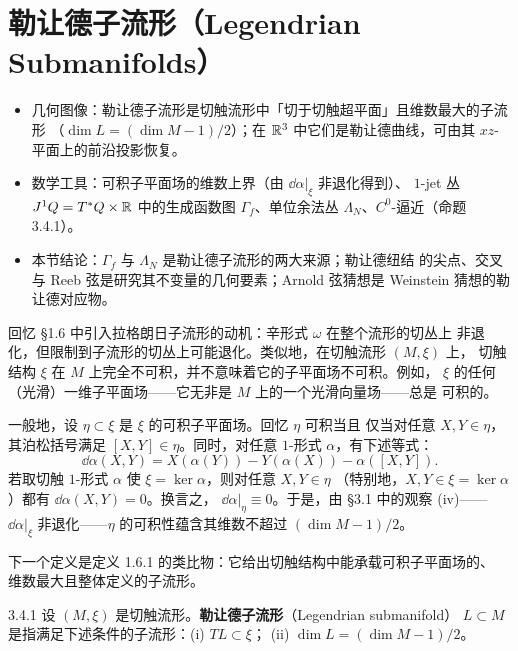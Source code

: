 \section{勒让德子流形（Legendrian Submanifolds）}

\begin{keytakeaways}
\begin{itemize}
  \item 几何图像：勒让德子流形是切触流形中「切于切触超平面」且维数最大的子流形
        （$\dim L=(\dim M-1)/2$）；在 $\mathbb{R}^3$ 中它们是勒让德曲线，可由其
        $xz$-平面上的前沿投影恢复。
  \item 数学工具：可积子平面场的维数上界（由 $\dd\alpha|_\xi$ 非退化得到）、
        $1$-jet 丛 $J^1Q=T^*Q\times\mathbb{R}$ 中的生成函数图 $\Gamma_f$、单位余法丛
        $\Lambda_N$、$C^0$-逼近（命题 3.4.1）。
  \item 本节结论：$\Gamma_f$ 与 $\Lambda_N$ 是勒让德子流形的两大来源；勒让德纽结
        的尖点、交叉与 Reeb 弦是研究其不变量的几何要素；Arnold 弦猜想是
        Weinstein 猜想的勒让德对应物。
\end{itemize}
\end{keytakeaways}

回忆 §1.6 中引入拉格朗日子流形的动机：辛形式 $\omega$ 在整个流形的切丛上
非退化，但限制到子流形的切丛上可能退化。类似地，在切触流形 $(M,\xi)$ 上，
切触结构 $\xi$ 在 $M$ 上完全不可积，并不意味着它的子平面场不可积。例如，
$\xi$ 的任何（光滑）一维子平面场——它无非是 $M$ 上的一个光滑向量场——总是
可积的。

一般地，设 $\eta\subset\xi$ 是 $\xi$ 的可积子平面场。回忆 $\eta$ 可积当且
仅当对任意 $X,Y\in\eta$，其泊松括号满足 $[X,Y]\in\eta$。同时，对任意
$1$-形式 $\alpha$，有下述等式：
\[
  \dd\alpha(X,Y)=X(\alpha(Y))-Y(\alpha(X))-\alpha([X,Y]).
\]
若取切触 $1$-形式 $\alpha$ 使 $\xi=\ker\alpha$，则对任意 $X,Y\in\eta$
（特别地，$X,Y\in\xi=\ker\alpha$）都有 $\dd\alpha(X,Y)=0$。换言之，
$\dd\alpha|_\eta\equiv0$。于是，由 §3.1 中的观察 (iv)——$\dd\alpha|_\xi$
非退化——$\eta$ 的可积性蕴含其维数不超过 $(\dim M-1)/2$。

下一个定义是定义 1.6.1 的类比物：它给出切触结构中能承载可积子平面场的、
维数最大且整体定义的子流形。

\begin{wdefn}{3.4.1}
设 $(M,\xi)$ 是切触流形。\textbf{勒让德子流形}（Legendrian submanifold）
$L\subset M$ 是指满足下述条件的子流形：(i) $TL\subset\xi$；
(ii) $\dim L=(\dim M-1)/2$。
\end{wdefn}


